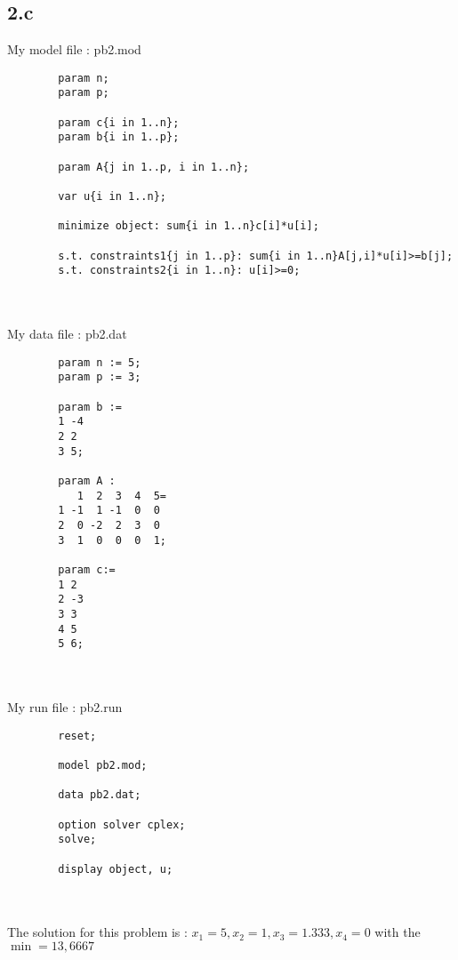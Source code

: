 \documentclass{article}
\newenvironment{DDbox}[1]{
\begin{lrbox}{\BBbox}
    \begin{minipage}{\linewidth}}
{\end{minipage}
\end{lrbox}\noindent\colorbox{Zgris}{\usebox{\BBbox}} \\
[.5cm]}
\begin{document}
\subsection*{2.c}
My model file : pb2.mod
\\
\begin{DDbox}{\linewidth}
    \begin{verbatim}
        param n;
        param p;
        
        param c{i in 1..n};
        param b{i in 1..p};
        
        param A{j in 1..p, i in 1..n};
        
        var u{i in 1..n};
        
        minimize object: sum{i in 1..n}c[i]*u[i];
        
        s.t. constraints1{j in 1..p}: sum{i in 1..n}A[j,i]*u[i]>=b[j];
        s.t. constraints2{i in 1..n}: u[i]>=0;
    \end{verbatim}
\end{DDbox}
\\
\newpage
My data file : pb2.dat
\\
\begin{DDbox}{\linewidth}
    \begin{verbatim}
        param n := 5;
        param p := 3;
        
        param b := 
        1 -4
        2 2
        3 5;
        
        param A :
           1  2  3  4  5=
        1 -1  1 -1  0  0
        2  0 -2  2  3  0
        3  1  0  0  0  1;
        
        param c:=
        1 2
        2 -3
        3 3
        4 5
        5 6; 
    \end{verbatim}
\end{DDbox}
\\
My run file : pb2.run
\\
\begin{DDbox}{\linewidth}
    \begin{verbatim}
        reset;

        model pb2.mod;
        
        data pb2.dat;
        
        option solver cplex;
        solve;
        
        display object, u;
    \end{verbatim}
\end{DDbox}
\\
The solution for this problem is : $x_1 = 5, x_2 = 1, x_3 = 1.333, x_4 = 0$ with the $\min = 13,6667$
\end{document}
